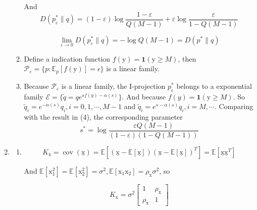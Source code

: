 \documentclass[a4paper]{article}
\begin{document}
\begin{enumerate}
\begin{enumerate}
  And \begin{equation}
    D(p^*_{\varepsilon}\| q) = (1-\varepsilon) \log \frac{1-\varepsilon}{ Q(M-1)} + \varepsilon \log \frac{\varepsilon}{ 1-Q(M-1)}
  \end{equation}

  \begin{equation}
    \lim_{\varepsilon \to 0 }  D(p^*_{\varepsilon}\| q) =  - \log  Q(M-1) = D(p^* \| q)
  \end{equation}

  \item Define a indication function $f(\mathrm{y}) = \mathbf{1}(\mathrm{y} \geqslant M)$, then $\mathcal{P}_{\varepsilon} = \{p: \mathbb{E}_{p}[f(\mathrm{y})] = \epsilon\}$ is a linear family.
  
  \item Because $\mathcal{P}_{\varepsilon}$ is a linear family, the I-projection $p_{\epsilon}^*$ belongs to a exponential family $\mathcal{E} = \{\tilde{q} = qe^{sf(y) - \alpha(s)}\}$. And because $f(y) = \mathbf{1}(\mathrm{y} \geqslant M)$. So $\tilde{q}_i  =  e^{-\alpha(s)} q_i, i =0,1,\cdots,M-1$ and $\tilde{q}_i  =  e^{s-\alpha(s)} q_i, i =M,\cdots$. Comparing with the result in (4), the corresponding parameter \begin{equation}
    s^* = \log \frac{\varepsilon Q(M-1)}{(1-\varepsilon)(1-Q(M-1))}
  \end{equation}

\end{enumerate}


\item \begin{enumerate}
  \item \begin{equation}
    K_{\mathrm{x}} = \operatorname{cov}(\underline{\mathrm{x}}) = \mathbb{E}\left[\left(\underline{\mathrm{x}} - \mathbb{E}[\underline{\mathrm{x}}]\right) \left(\underline{\mathrm{x}} - \mathbb{E}[\underline{\mathrm{x}}]\right)^T\right] = \mathbb{E}\left[\underline{\mathrm{x}}\underline{\mathrm{x}}^T\right]
  \end{equation}

  And $\mathbb{E}[\mathrm{x}_1^2] = \mathbb{E}[\mathrm{x}_2^2] = \sigma^2, \mathbb{E}[\mathrm{x}_1\mathrm{x_2}] = \rho_{\mathrm{x}} \sigma^2$, so

  \begin{equation}
    K_{\mathrm{x}} = \sigma^2  \begin{bmatrix}
       1 & \rho_{\mathrm{x}}\\ \rho_{\mathrm{x}} & 1
    \end{bmatrix}
  \end{equation}


\end{enumerate}
\end{enumerate}
\end{document}
